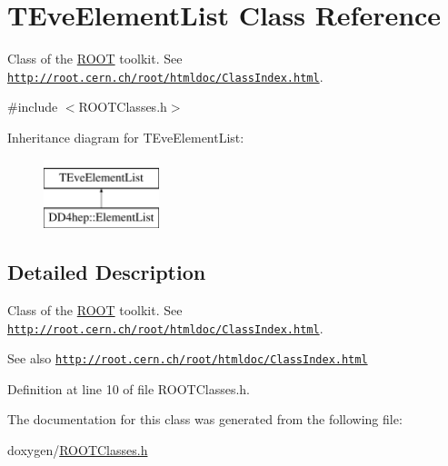 \hypertarget{class_t_eve_element_list}{}\section{T\+Eve\+Element\+List Class Reference}
\label{class_t_eve_element_list}


Class of the \hyperlink{namespace_r_o_o_t}{R\+O\+OT} toolkit. See \href{http://root.cern.ch/root/htmldoc/ClassIndex.html}{\tt http\+://root.\+cern.\+ch/root/htmldoc/\+Class\+Index.\+html}.  




{\ttfamily \#include $<$R\+O\+O\+T\+Classes.\+h$>$}

Inheritance diagram for T\+Eve\+Element\+List\+:\begin{figure}[H]
\begin{center}
\leavevmode
\includegraphics[height=2.000000cm]{class_t_eve_element_list}
\end{center}
\end{figure}


\subsection{Detailed Description}
Class of the \hyperlink{namespace_r_o_o_t}{R\+O\+OT} toolkit. See \href{http://root.cern.ch/root/htmldoc/ClassIndex.html}{\tt http\+://root.\+cern.\+ch/root/htmldoc/\+Class\+Index.\+html}. 

\begin{DoxySeeAlso}{See also}
\href{http://root.cern.ch/root/htmldoc/ClassIndex.html}{\tt http\+://root.\+cern.\+ch/root/htmldoc/\+Class\+Index.\+html} 
\end{DoxySeeAlso}


Definition at line 10 of file R\+O\+O\+T\+Classes.\+h.



The documentation for this class was generated from the following file\+:\begin{DoxyCompactItemize}
\item 
doxygen/\hyperlink{_r_o_o_t_classes_8h}{R\+O\+O\+T\+Classes.\+h}\end{DoxyCompactItemize}
